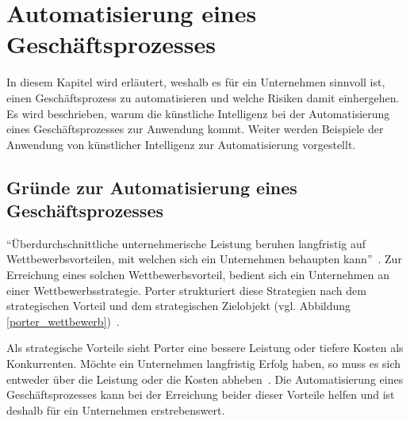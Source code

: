 \section{Automatisierung eines Geschäftsprozesses}
\label{chap:automation}

In diesem Kapitel wird erläutert, weshalb es für ein Unternehmen sinnvoll ist, einen Geschäftsprozess zu automatisieren und welche Risiken damit einhergehen. Es wird beschrieben, warum die künstliche Intelligenz bei der Automatisierung eines Geschäftsprozesses zur Anwendung kommt. Weiter werden Beispiele der Anwendung von künstlicher Intelligenz zur Automatisierung vorgestellt.

\subsection{Gründe zur Automatisierung eines Geschäftsprozesses}

\enquote{Überdurchschnittliche unternehmerische Leistung beruhen langfristig auf Wettbewerbsvorteilen, mit welchen sich ein Unternehmen behaupten kann}~\autocite[104]{Capaul2010}. Zur Erreichung eines solchen Wettbewerbsvorteil, bedient sich ein Unternehmen an einer Wettbewerbsstrategie. Porter strukturiert diese Strategien nach dem strategischen Vorteil und dem strategischen Zielobjekt (vgl. Abbildung \ref{porter_wettbewerb})~\autocite{Capaul2010}. 

Als strategische Vorteile sieht Porter eine bessere Leistung oder tiefere Kosten als Konkurrenten. Möchte ein Unternehmen langfristig Erfolg haben, so muss es sich entweder über die Leistung oder die Kosten abheben~\autocite{Capaul2010}. Die Automatisierung eines Geschäftsprozesses kann bei der Erreichung beider dieser Vorteile helfen und ist deshalb für ein Unternehmen erstrebenswert. 


